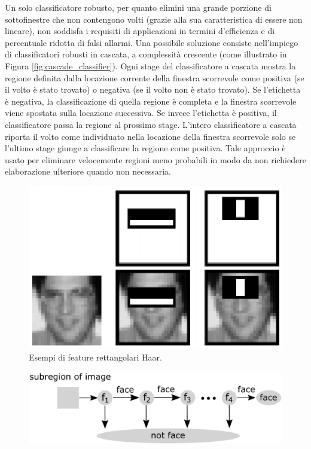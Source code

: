 \documentclass[12pt]{article}
\begin{document}
\begin{itemize}
\begin{itemize}
\begin{itemize}
			Un solo classificatore robusto, per quanto elimini una grande porzione di sottofinestre che non contengono volti (grazie alla sua caratteristica di essere non lineare), non soddisfa i requisiti di applicazioni in termini d'efficienza e di percentuale ridotta di falsi allarmi. Una possibile soluzione consiste nell'impiego di classificatori robusti in cascata, a complessità crescente (come illustrato in Figura \ref{fig:cascade_classifier}). Ogni stage del classificatore a cascata mostra la regione definita dalla locazione corrente della finestra scorrevole come positiva (se il volto è stato trovato) o negativa (se il volto non è stato trovato). Se l'etichetta è negativa, la classificazione di quella regione è completa e la finestra scorrevole viene spostata sulla locazione successiva. Se invece l'etichetta è positiva, il classificatore passa la regione al prossimo stage. L'intero classificatore a cascata riporta il volto come individuato nella locazione della finestra scorrevole solo se l'ultimo stage giunge a classificare la regione come positiva. Tale approccio è usato per eliminare velocemente regioni meno probabili in modo da non richiedere elaborazione ulteriore quando non necessaria.
		\end{itemize}
		\vspace{0.5cm}
		\begin{figure}[!htb]
			\centering
			\includegraphics[scale=0.62]{eps/haar_features.eps}
			\caption{Esempi di feature rettangolari Haar.}
			\label{fig:haar_features}
		\end{figure}
		\begin{figure}[!htb]
			\centering
			\includegraphics[scale=0.28]{eps/cascade_classifier.eps}

\end{figure}
\end{itemize}
\end{itemize}
\end{document}
